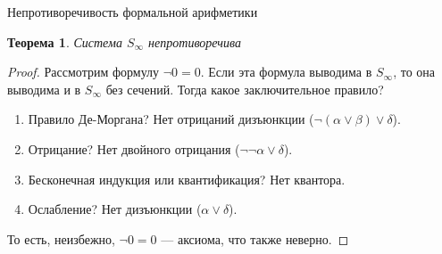 \documentclass[aspectratio=169]{beamer}
\newtheorem{thm}{Теорема}[section]
\begin{document}
\begin{frame}{Непротиворечивость формальной арифметики}
\begin{thm}Система $S_\infty$ непротиворечива\end{thm}
\begin{proof} \pause
Рассмотрим формулу $\neg 0=0$. 
Если эта формула выводима в $S_\infty$, то она выводима и в $S_\infty$ без сечений.
Тогда какое заключительное правило? \pause
\begin{enumerate}
\item Правило Де-Моргана? \pause Нет отрицаний дизъюнкции ($\neg(\alpha\vee\beta)\vee\delta$). \pause
\item Отрицание? \pause Нет двойного отрицания ($\neg\neg\alpha\vee\delta$). \pause
\item Бесконечная индукция или квантификация? \pause Нет квантора. \pause
\item Ослабление? \pause Нет дизъюнкции ($\alpha \vee \delta$). \pause
\end{enumerate}

То есть, неизбежно, $\neg 0=0$ --- аксиома, что также неверно.
\end{proof}
\end{frame}
\end{document}
